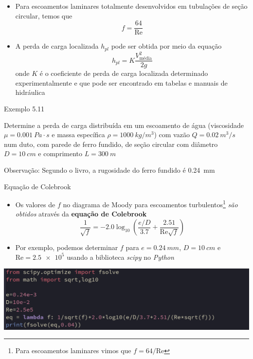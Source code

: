 \documentclass[t,%
brazilian,%
11pt,%
aspectratio=169,%
table%
]{beamer}
\begin{document}
\begin{frame}{}
    \begin{itemize} 
        \item Para escoamentos laminares totalmente desenvolvidos em tubulações
            de seção circular, temos que
            \[
                f=\frac{64}{\text{Re}}
            \]
        \item A perda de carga localizada \(h_{pl}\) pode ser obtida por meio da equação
            \[
                h_{pl} = K\frac{V_\text{média}^2}{2g}
            \]
            onde \(K\) é o coeficiente de perda de carga localizada determinado
            experimentalmente e que pode ser encontrado em tabelas e manuais de 
            hidráulica
    \end{itemize}
\end{frame}

\begin{frame}{Exemplo 5.11}
    \begin{minipage}{\textwidth}
        Determine a perda de carga distribuída em um escoamento de água
        (viscosidade \(\mu = \SI{0.001}{Pa\cdot s}\) e massa específica 
        \(\rho = \SI{1000}{kg/m^3}\)) com vazão \(Q= \SI{0.02}{m^3/s}\) num duto,
        com parede de ferro fundido, de seção circular com diâmetro \(D= \SI{10}{cm}\)
        e comprimento \(L=\SI{300}{m}\)
    \end{minipage}

    \vspace{1cm}
    Observação: Segundo o livro, a rugosidade do ferro fundido é \SI{0.24}{mm}
\end{frame}


\begin{frame}{Equação de Colebrook}
    \begin{itemize}
        \item Os valores de \(f\) no diagrama de Moody para escoamentos
            turbulentos\footnote{Para escoamentos laminares vimos que
            \(f=64/\text{Re}\)} \textit{são obtidos} através da \textbf{equação
            de Colebrook}
            \[
                \frac{1}{\sqrt{f}}=
                -\num{2.0}\log_{10} \left(\frac{e/D}{\num{3.7}}+\frac{\num{2.51}}{\text{Re}\sqrt{f}}\right)
            \]
        \item Por exemplo, podemos determinar \(f\) para \(e = \SI{0.24}{mm}\),
            \(D=\SI{10}{cm}\) e \(\text{Re}=\num{2.5e5}\) usando a biblioteca \textit{scipy} no
            \textit{Python}
    \end{itemize}
    \centering
    \includegraphics[width=\textwidth]{images/Captura de tela de 2025-05-13 14-30-50.png}
\end{frame}
\end{document}

